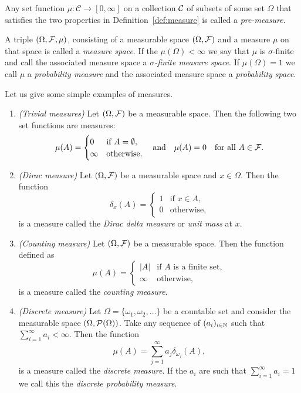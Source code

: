 Any set function $\mu : \mathcal{C} \to [0,\infty]$ on a collection $\mathcal C$ of subsets of some set $\Omega$ that satisfies the two properties in Definition~\ref{def:measure} is called a \emph{pre-measure}.

A triple $(\Omega, \mathcal F, \mu)$, consisting of a measurable space $(\Omega, \mathcal F)$ and a measure $\mu$ on that space is called a \emph{measure space}. If the $\mu(\Omega) < \infty$ we say that $\mu$ is $\sigma$-finite and call the associated measure space a \emph{$\sigma$-finite measure space}. If $\mu(\Omega) = 1$ we call $\mu$ a \emph{probability measure} and the associated measure space a \emph{probability space}.

Let us give some simple examples of measures.

\begin{example}
\hfil
\begin{enumerate}
\item \textit{(Trivial measures)} Let $(\Omega, \mathcal F)$ be a measurable space. Then the following two set functions are measures:
\[
	\mu(A) = \begin{cases}
		0 &\text{if } A = \emptyset, \\
		\infty &\text{otherwise.}
	\end{cases}
	\quad \text{and} \quad
	\mu(A) = 0 \quad \text{for all } A \in \mathcal F.
\]
\item \textit{(Dirac measure)} Let $(\Omega, \mathcal F)$ be a measurable space and $x \in \Omega$. Then the function
\[
	\delta_x(A) = \begin{cases}
		1 &\text{if } x \in A, \\
		0 &\text{otherwise},
	\end{cases}
\]
is a measure called the \emph{Dirac delta measure} or \emph{unit mass} at $x$.
\item \textit{(Counting measure)} Let $(\Omega, \mathcal F)$ be a measurable space. Then the function defined as
\[
	\mu(A) = \begin{cases}
		|A| &\text{if $A$ is a finite set},\\
		\infty &\text{otherwise}, 
	\end{cases}
\]
is a measure called the \emph{counting measure}.
\item \textit{(Discrete measure)} Let $\Omega = \{\omega_1, \omega_2, \dots\}$ be a countable set and consider the measurable space $(\Omega, \mathcal P(\Omega))$. Take any sequence of $(a_i)_{i \in \mathbb N}$ such that $\sum_{i = 1}^\infty a_i < \infty$. Then the function
\[
	\mu(A) = \sum_{j = 1}^\infty a_j \delta_{\omega_j}(A),
\]
is a measure called the \emph{discrete measure}. If the $a_i$ are such that $\sum_{i = 1}^\infty a_i = 1$ we call this the \emph{discrete probability measure}.
\end{enumerate}
\end{example}

